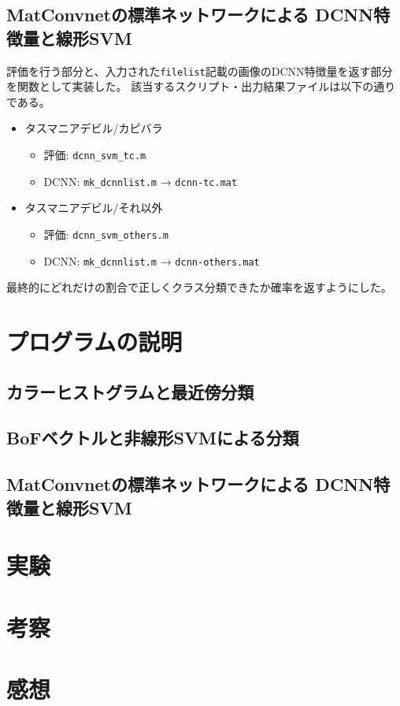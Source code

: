 \documentclass[11pt,a4paper, uplatex]{jsreport}
\begin{document}
\subsection{MatConvnetの標準ネットワークによる DCNN特徴量と線形SVM}
評価を行う部分と、入力された\texttt{filelist}記載の画像のDCNN特徴量を返す部分を関数として実装した。
該当するスクリプト・出力結果ファイルは以下の通りである。
\begin{itemize}
  \item タスマニアデビル/カピバラ
  \begin{itemize}
    \item 評価: \texttt{dcnn_svm_tc.m}
    \item DCNN: \texttt{mk_dcnnlist.m} → \texttt{dcnn-tc.mat}
  \end{itemize}
  \item タスマニアデビル/それ以外
  \begin{itemize}
    \item 評価: \texttt{dcnn_svm_others.m}
    \item DCNN: \texttt{mk_dcnnlist.m} → \texttt{dcnn-others.mat}
  \end{itemize}
\end{itemize}
最終的にどれだけの割合で正しくクラス分類できたか確率を返すようにした。
\section{プログラムの説明}
\subsection{カラーヒストグラムと最近傍分類}
\subsection{BoFベクトルと非線形SVMによる分類}
\subsection{MatConvnetの標準ネットワークによる DCNN特徴量と線形SVM}
\section{実験}
\section{考察}
\section{感想}
\end{document}
